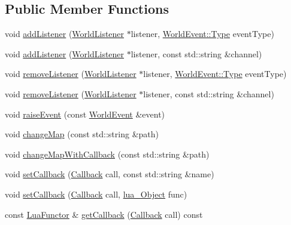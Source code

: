 \subsection*{Public Member Functions}
\begin{DoxyCompactItemize}
\item 
void \hyperlink{classZeta_1_1WorldManager_a4d71d05f9f5d6b46744abc0cd973630d}{add\+Listener} (\hyperlink{classZeta_1_1WorldListener}{World\+Listener} $\ast$listener, \hyperlink{classZeta_1_1WorldEvent_a92adb82c22c6f59afec5911098f85158}{World\+Event\+::\+Type} event\+Type)
\item 
void \hyperlink{classZeta_1_1WorldManager_aca6da0cf43ee96f88b818ccc1afaf764}{add\+Listener} (\hyperlink{classZeta_1_1WorldListener}{World\+Listener} $\ast$listener, const std\+::string \&channel)
\item 
void \hyperlink{classZeta_1_1WorldManager_a8e2ad66bc6420d386471cf1a4bfc1de8}{remove\+Listener} (\hyperlink{classZeta_1_1WorldListener}{World\+Listener} $\ast$listener, \hyperlink{classZeta_1_1WorldEvent_a92adb82c22c6f59afec5911098f85158}{World\+Event\+::\+Type} event\+Type)
\item 
void \hyperlink{classZeta_1_1WorldManager_a64f450d494c1610d6f170adcc5fc7868}{remove\+Listener} (\hyperlink{classZeta_1_1WorldListener}{World\+Listener} $\ast$listener, const std\+::string \&channel)
\item 
void \hyperlink{classZeta_1_1WorldManager_acfab878b37b6008578c71bada4245631}{raise\+Event} (const \hyperlink{classZeta_1_1WorldEvent}{World\+Event} \&event)
\item 
void \hyperlink{classZeta_1_1WorldManager_a29a3b95fb33eb3b4ed65e17c98e79692}{change\+Map} (const std\+::string \&path)
\item 
void \hyperlink{classZeta_1_1WorldManager_acf3dd4329089cbc1115bfabb6957c5ef}{change\+Map\+With\+Callback} (const std\+::string \&path)
\item 
void \hyperlink{classZeta_1_1WorldManager_a992cadb0cf1843f58e7596945c8a7c6b}{set\+Callback} (\hyperlink{classZeta_1_1WorldManager_a196f5dc39fe2f6856871fef729fd8454}{Callback} call, const std\+::string \&name)
\item 
void \hyperlink{classZeta_1_1WorldManager_ad595ba816d78c0c65f8407b66e384c1b}{set\+Callback} (\hyperlink{classZeta_1_1WorldManager_a196f5dc39fe2f6856871fef729fd8454}{Callback} call, \hyperlink{ZetaConfig_8hpp_ae7be32b73848041a60f2412f72bbb221}{lua\+\_\+\+Object} func)
\item 
const \hyperlink{classZeta_1_1LuaFunctor}{Lua\+Functor} \& \hyperlink{classZeta_1_1WorldManager_a46b2e31355813dcf4ad1900c65f64ab9}{get\+Callback} (\hyperlink{classZeta_1_1WorldManager_a196f5dc39fe2f6856871fef729fd8454}{Callback} call) const 

\end{DoxyCompactItemize}
